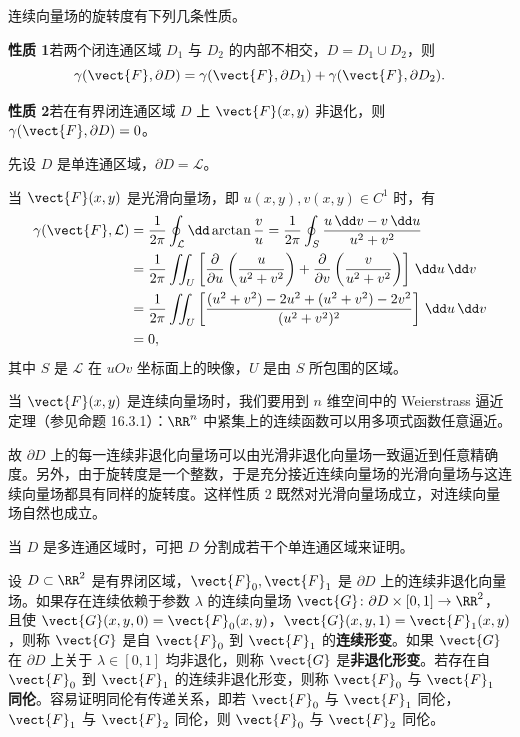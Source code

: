 连续向量场的旋转度有下列几条性质。

\textbf{性质 1}\quad 若两个闭连通区域 $D_1$ 与 $D_2$ 的内部不相交，$D=D_1\cup D_2$，则
\[
  \gamma(\vect{F},\partial D)=\gamma(\vect{F},\partial D_1)+\gamma(\vect{F},\partial D_2).
\]

\textbf{性质 2}\quad 若在有界闭连通区域 $D$ 上 $\vect{F}(x,y)$ 非退化，则 $\gamma(\vect{F},\partial D)=0$。

\begin{xproof}
先设 $D$ 是单连通区域，$\partial D=\mathcal L$。

当 $\vect{F}(x,y)$ 是光滑向量场，即 $u(x,y),v(x,y)\in C^1$ 时，有
\begin{align*}
  \gamma(\vect{F},\mathcal L)
  &=\frac1{2\pi}\oint_\mathcal L\dd\arctan\frac vu
   =\frac1{2\pi}\oint_S\frac{u\,\dd v-v\,\dd u}{u^2+v^2}\\
  &=\frac1{2\pi}\iint_U\left[\frac{\partial}{\partial u}\left(\frac{u}{u^2+v^2}\right)+\frac{\partial}{\partial v}\left(\frac{v}{u^2+v^2}\right)\right]\,\dd u\,\dd v\\
  &=\frac1{2\pi}\iint_U\left[\frac{(u^2+v^2)-2u^2+(u^2+v^2)-2v^2}{(u^2+v^2)^2}\right]\,\dd u\,\dd v\\
  &=0,
\end{align*}
其中 $S$ 是 $\mathcal L$ 在 $uOv$ 坐标面上的映像，$U$ 是由 $S$ 所包围的区域。

当 $\vect{F}(x,y)$ 是连续向量场时，我们要用到 $n$ 维空间中的 Weierstrass 逼近定理（参见命题 16.3.1）：$\RR^n$ 中紧集上的连续函数可以用多项式函数任意逼近。

故 $\partial D$ 上的每一连续非退化向量场可以由光滑非退化向量场一致逼近到任意精确度。另外，由于旋转度是一个整数，于是充分接近连续向量场的光滑向量场与这连续向量场都具有同样的旋转度。这样性质 2 既然对光滑向量场成立，对连续向量场自然也成立。

当 $D$ 是多连通区域时，可把 $D$ 分割成若干个单连通区域来证明。
\end{xproof}

设 $D\subset\RR^2$ 是有界闭区域，$\vect{F}_0,\vect{F}_1$ 是 $\partial D$ 上的连续非退化向量场。如果存在连续依赖于参数 $\lambda$ 的连续向量场 $\vect{G}\colon\partial D\times[0,1]\to\RR^2$，且使 $\vect{G}(x,y,0)=\vect{F}_0(x,y)$，$\vect{G}(x,y,1)=\vect{F}_1(x,y)$，则称 $\vect{G}$ 是自 $\vect{F}_0$ 到 $\vect{F}_1$ 的\textbf{连续形变}。如果 $\vect{G}$ 在 $\partial D$ 上关于 $\lambda\in[0,1]$ 均非退化，则称 $\vect{G}$ 是\textbf{非退化形变}。若存在自 $\vect{F}_0$ 到 $\vect{F}_1$ 的连续非退化形变，则称 $\vect{F}_0$ 与 $\vect{F}_1$ \textbf{同伦}。容易证明同伦有传递关系，即若 $\vect{F}_0$ 与 $\vect{F}_1$ 同伦，$\vect{F}_1$ 与 $\vect{F}_2$ 同伦，则 $\vect{F}_0$ 与 $\vect{F}_2$ 同伦。

